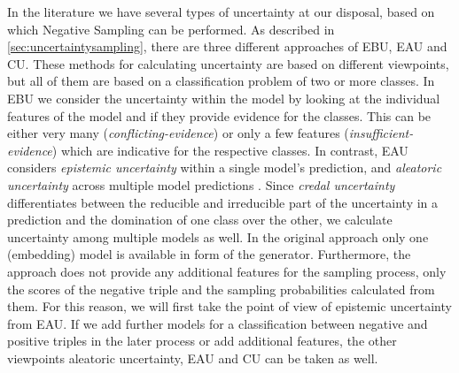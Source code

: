 In the literature we have several types of uncertainty at our disposal, based on which Negative Sampling can be performed.
As described in \autoref{sec:uncertaintysampling}, there are three different approaches of \ac{EBU}, \ac{EAU} and \ac{CU}.
These methods for calculating uncertainty are based on different viewpoints, but all of them are based on a classification problem of two or more classes.
In \ac{EBU} we consider the uncertainty within the model by looking at the individual features of the model and if they provide evidence for the classes.
This can be either very many (\textit{conflicting-evidence})  or only a few features (\textit{insufficient-evidence}) which are indicative for the respective classes.
In contrast, \ac{EAU} considers \textit{epistemic uncertainty} within a single model’s prediction, and \textit{aleatoric uncertainty} across multiple model predictions \cite{human-in-the-loop}.
Since \textit{credal uncertainty} differentiates between the
reducible and irreducible part of the uncertainty in a prediction and the domination of one class over the other, we calculate uncertainty among multiple models as well.
In the original \kbgan approach only one (embedding) model is available in form of the generator.
Furthermore, the \kbgan approach does not provide any additional features for the sampling process, only the scores of the negative triple and the sampling probabilities calculated from them.
For this reason, we will first take the point of view of epistemic uncertainty from \ac{EAU}.
If we add further models for a classification between negative and positive triples in the later process or add additional features, the other viewpoints aleatoric uncertainty, \ac{EAU} and \ac{CU} can be taken as well.

